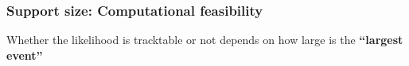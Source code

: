 \documentclass[aspectratio=169, 9pt]{beamer}
\begin{document}
\begin{frame}
\begin{minipage}[t]{.3\linewidth}
\end{minipage}\hfill
\begin{minipage}[t]{.3\linewidth}
	\centering
\end{minipage}
\vfill\hfill{}
	
\end{frame}

\begin{frame}
	\frametitle{Support size: Computational feasibility}
	Whether the likelihood is tracktable or not depends on how large is the \textbf{``largest event''}
	\begin{figure}
	\end{figure}
\end{frame}
\end{document}
